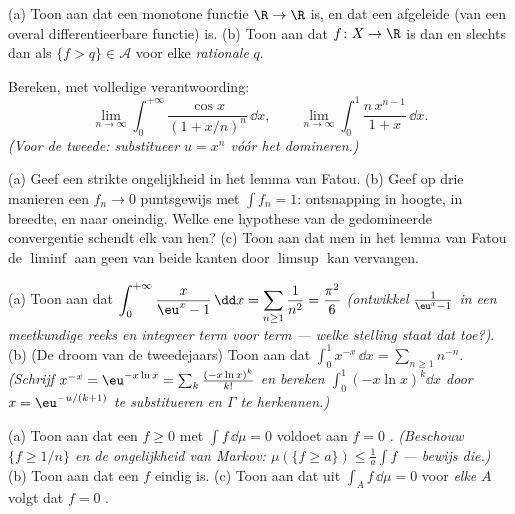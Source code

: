 \begin{exercise}[$\star$]\label{exo:b3:lebesgue:1}
(a) Toon aan dat een monotone functie $\R \to \R$ 
is, en dat een afgeleide (van een overal differentieerbare
functie)  is.
(b) Toon aan dat $f \colon X \to \R$  is dan en slechts
dan als $\{f > q\} \in \mathcal A$ voor elke \emph{rationale}
$q$.
\end{exercise}

\begin{exercise}[$\star$]\label{exo:b3:lebesgue:2}
Bereken, met volledige verantwoording:
\[
\lim_{n\to\infty}\int_0^{+\infty}
\frac{\cos x}{(1 + x/n)^{n}}\,\dd x,
\qquad
\lim_{n\to\infty}\int_0^1 \frac{n\,x^{n-1}}{1 + x}\,\dd x .
\]
\emph{(Voor de tweede: substitueer $u = x^n$ vóór het
domineren.)}
\end{exercise}

\begin{exercise}[$\star\star$]\label{exo:b3:lebesgue:3}
(a) Geef een strikte ongelijkheid in het lemma van Fatou.
(b) Geef op drie manieren een $f_n \to 0$ puntsgewijs met $\int
f_n = 1$: ontsnapping in hoogte, in breedte, en naar oneindig.
Welke ene hypothese van de gedomineerde convergentie schendt elk
van hen?
(c) Toon aan dat men in het lemma van Fatou de $\liminf$ aan geen
van beide kanten door $\limsup$ kan vervangen.
\end{exercise}

\begin{exercise}[$\star\star$]\label{exo:b3:lebesgue:4}
(a) Toon aan dat $\displaystyle\int_0^{+\infty}\frac{x}{\eu^x -
1}\,\dd x = \sum_{n\geq1}\frac1{n^2} = \frac{\pi^2}6$
\emph{(ontwikkel $\frac1{\eu^x - 1}$ in een meetkundige reeks en
integreer term voor term --- welke stelling staat dat toe?)}.
(b) (De droom van de tweedejaars) Toon aan dat
$\displaystyle\int_0^1 x^{-x}\,\dd x = \sum_{n\geq1}n^{-n}$.
\emph{(Schrijf $x^{-x} = \eu^{-x\ln x} = \sum_k\frac{(-x\ln
x)^k}{k!}$ en bereken $\int_0^1(-x\ln x)^k\dd x$ door $x =
\eu^{-u/(k+1)}$ te substitueren en $\Gamma$ te herkennen.)}
\end{exercise}

\begin{exercise}[$\star\star$]\label{exo:b3:lebesgue:5}
(a) Toon aan dat een  $f \geq 0$ met $\int f\,\dd\mu = 0$
voldoet aan $f = 0$ . \emph{(Beschouw $\{f \geq 1/n\}$
en de ongelijkheid van Markov: $\mu(\{f \geq a\}) \leq \frac1a\int
f$ --- bewijs die.)}
(b) Toon aan dat een  $f$  eindig is.
(c) Toon aan dat uit $\int_A f\,\dd\mu = 0$ voor \emph{elke}
 $A$ volgt dat $f = 0$ .
\end{exercise}


